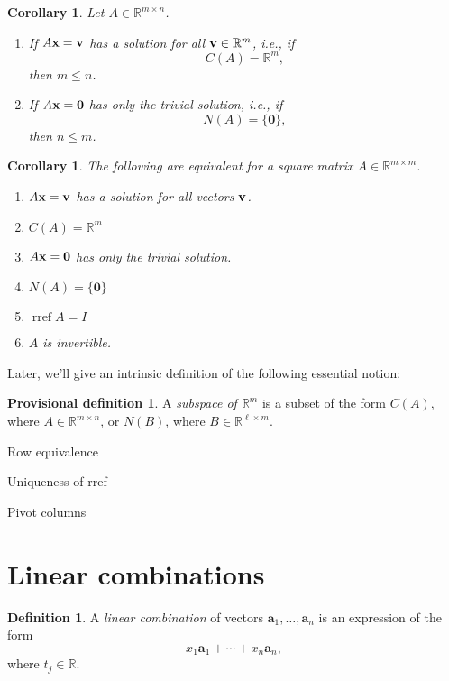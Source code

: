 \documentclass[12pt]{amsart}
\newcommand{\RR}{\mathbb{R}} \DeclareMathOperator{\rref}{rref}
\newtheorem{corollary}[theorem]{Corollary} \newtheorem{lemma}[theorem]{Lemma}
\theoremstyle{definition} \newtheorem{definition}[theorem]{Definition}
\newtheorem{provdef}[theorem]{Provisional definition}
\newcommand{\ba}{\mathbf{a}} \newcommand{\bb}{\mathbf{b}}
\newcommand{\bzero}{\mathbf{0}}
\newcommand{\bas}{\ba_1,\ldots,\ba_n}
\begin{document}
\begin{corollary} Let $A\in\RR^{m\times n}$.  \begin{enumerate} \item If
	$A\mathbf{x}=\mathbf{v}$ has a solution for all $\bv\in\RR^m$, i.e., if
	$$C(A)=\RR^m,$$ then $m\leq n$.  \item If $A\bx=\bzero$ has only the
	trivial solution, i.e., if $$N(A)=\{\bzero\},$$ then $n\leq m$.
	\end{enumerate} \end{corollary}

\begin{corollary} The following are equivalent for a square matrix
	$A\in\RR^{m\times m}$.  \begin{enumerate} \item $A\mathbf{x}=\mathbf{v}$ has a
		solution for all vectors $\mathbf{v}$.  \item $C(A)=\RR^m$ \item
		$A\bx=\bzero$ has only the trivial solution.  \item
		$N(A)=\{\bzero\}$ \item $\rref A = I$ \item $A$ is invertible.
\end{enumerate} \end{corollary}

Later, we'll give an intrinsic definition of the following essential notion:
\begin{provdef} A \emph{subspace of $\RR^m$} is a subset of the form $C(A)$,
where $A\in\RR^{m\times n}$, or $N(B)$, where $B\in\RR^{\ell\times m}$.
\end{provdef}

Row equivalence

Uniqueness of rref

Pivot columns


\section{Linear combinations}

\begin{definition}\label{df:lc_span} A \emph{linear combination} of vectors
$\bas$ is an expression of the form \[ x_1\ba_1+\cdots +x_n\ba_n, \] where
$t_j\in \RR$.  \end{definition}
\end{document}
